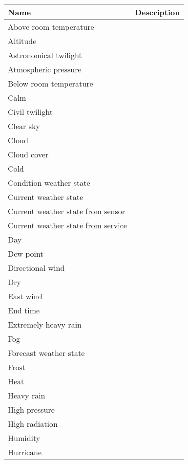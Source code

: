 \begin{longtable}{|p{}|p{}|}
  \hline
  \textbf{Name} & \textbf{Description} \\
  \hline\hline
  Above room temperature & \\
  \hline
  Altitude & \\
  \hline
  Astronomical twilight & \\
  \hline
  Atmospheric pressure & \\
  \hline
  Below room temperature & \\
  \hline
  Calm & \\
  \hline
  Civil twilight & \\
  \hline
  Clear sky & \\
  \hline
  Cloud & \\
  \hline
  Cloud cover & \\
  \hline
  Cold & \\
  \hline
  Condition weather state & \\
  \hline
  Current weather state & \\
  \hline
  Current weather state from sensor & \\
  \hline
  Current weather state from service & \\
  \hline
  Day & \\
  \hline
  Dew point & \\
  \hline
  Directional wind & \\
  \hline
  Dry & \\
  \hline
  East wind & \\
  \hline
  End time & \\
  \hline
  Extremely heavy rain & \\
  \hline
  Fog & \\
  \hline
  Forecast weather state & \\
  \hline
  Frost & \\
  \hline
  Heat & \\
  \hline
  Heavy rain & \\
  \hline
  High pressure & \\
  \hline
  High radiation & \\
  \hline
  Humidity & \\
  \hline
  Hurricane & \\

\end{longtable}
